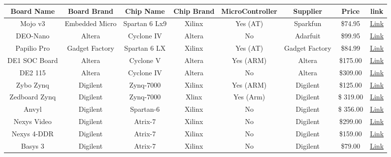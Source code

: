 \documentclass{article}
\begin{document}
\begin{landscape}
\begin{center}

\begin{tabular}{||c c c c c c c c||}
	\hline
	Board Name  & Board Brand  & Chip Name & Chip Brand & MicroController  & Supplier & Price & link \\
	\hline\hline
	Mojo v3 & Embedded Micro  & Spartan 6 Lx9 & Xilinx & Yes (AT)&  Sparkfun & \$74.95 & 
	\href{https://www.sparkfun.com/products/11953}{Link}\\
	DEO-Nano & Altera & Cyclone IV & Altera & No &  Adarfuit & \$99.95 
	&\href{http://www.adafruit.com/products/451}{Link}\\
	Papilio Pro & Gadget Factory & Spartan 6 LX & Xilinx & Yes (AT) & Gadget Factory & \$84.99 & 
	\href{http://store.gadgetfactory.net/papilio-pro/}{Link}\\
	DE1 SOC Board & Altera & Cyclone V & Altera & Yes (ARM) & Altera & \$175.00 & 
	\href{http://wl.altera.com/education/univ/materials/boards/de1-soc/unv-de1-soc-board.html}{Link}\\
	DE2 115 & Altera & Cyclone IV & Altera &  No & Altera & \$309.00 & 
	\href{http://wl.altera.com/education/univ/materials/boards/de2-115/unv-de2-115-board.html}{Link}\\
	Zybo Zynq & Digilent & Zynq-7000 & Xilinx & Yes (ARM) & Digilent & \$125.00 & 
	\href{http://www.digilentinc.com/Products/Detail.cfm?NavPath=2,400,1198&Prod=ZYBO}{Link}\\
	Zedboard Zynq & Digilent & Zynq-7000 & Xlinx & Yes (Arm) & Digilent &  \$ 319.00 & 
	\href{http://www.digilentinc.com/Products/Detail.cfm?NavPath=2,400,1028&Prod=ZEDBOARD}{Link}\\
	Anvyl & Digilent & Spartan-6 & Xilinx & No & Digilent &  \$ 356.00 & 
	\href{http://www.digilentinc.com/Products/Detail.cfm?NavPath=2,400,1175&Prod=ANVYL}{Link}\\
	Nexys Video & Digilent & Atrix-7 & Xilinx & No & Digilent & \$299.00 &
	 \href{http://www.digilentinc.com/Products/Detail.cfm?NavPath=2,400,1475&Prod=NEXYS-VIDEO}{Link}\\
	Nexys 4-DDR & Digilent & Atrix-7 & Xilinx & No & Digilent & \$159.00 & 
	\href{http://www.digilentinc.com/Products/Detail.cfm?NavPath=2,400,1338&Prod=NEXYS4DDR}{Link}\\
	Basys 3 & Digilent & Atrix-7 & Xilinx & No & Digilent & \$79.00 & 
	\href{http://www.digilentinc.com/Products/Detail.cfm?NavPath=2,400,1288&Prod=BASYS3}{Link} \\
\hline
	
\end{tabular}
\end{center}
\end{landscape}
\end{document}
